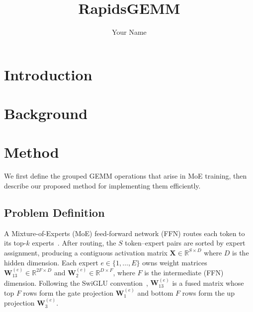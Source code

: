 \documentclass[11pt,a4paper]{article}
\title{\textbf{RapidsGEMM}}
\author{Your Name}
\date{}
\theoremstyle{definition}
\begin{document}
\maketitle

\begin{abstract}
\end{abstract}

\section{Introduction}

\section{Background}

\section{Method}

We first define the grouped GEMM operations that arise in MoE training,
then describe our proposed method for implementing them efficiently.

\subsection{Problem Definition}

A Mixture-of-Experts (MoE) feed-forward network (FFN) routes each token to
its top-$k$ experts~\cite{shazeer2017outrageously}. After routing, the $S$
token--expert pairs are sorted by expert assignment, producing a contiguous
activation matrix $\mathbf{X} \in \mathbb{R}^{S \times D}$ where $D$ is the
hidden dimension. Each expert $e \in \{1, \dots, E\}$ owns weight matrices
$\mathbf{W}_{13}^{(e)} \in \mathbb{R}^{2F \times D}$ and
$\mathbf{W}_{2}^{(e)} \in \mathbb{R}^{D \times F}$, where $F$ is the
intermediate (FFN) dimension. Following the SwiGLU
convention~\cite{shazeer2017outrageously}, $\mathbf{W}_{13}^{(e)}$ is a
fused matrix whose top $F$ rows form the gate projection
$\mathbf{W}_{1}^{(e)}$ and bottom $F$ rows form the up projection
$\mathbf{W}_{3}^{(e)}$.
\end{document}
